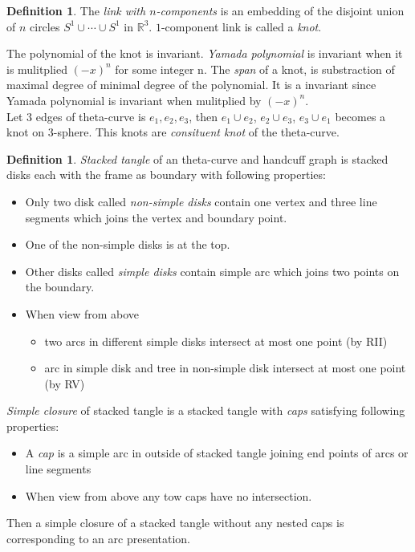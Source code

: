 \documentclass{article}
\theoremstyle{definition}
\newtheorem{defn}[thm]{Definition}
\theoremstyle{theorem}
\theoremstyle{proposition}
\theoremstyle{corollary}
\begin{document}
\begin{defn}
    The \textit{link with $n$-components} is an embedding of the disjoint union of $n$ circles $S^1 \cup \cdots \cup S^1$ in $\mathbb{R}^3$. $1$-component link is called a \textit{knot}.
\end{defn}

The polynomial of the knot is invariant. \textit{Yamada polynomial} is invariant when it is mulitplied $(-x)^n$ for some integer n. The \textit{span} of a knot, is substraction of maximal degree of minimal degree of the polynomial. It is a invariant since Yamada polynomial is invariant when mulitplied by $(-x)^n$.\\

Let 3 edges of theta-curve is $e_1, e_2, e_3$, then $e_1 \cup e_2$, $e_2 \cup e_3$, $e_3 \cup e_1$ becomes a knot on 3-sphere. This knots are \textit{consituent knot} of the theta-curve.

\begin{defn}
    \textit{Stacked tangle} of an theta-curve and handcuff graph is stacked disks each with the frame as boundary with following properties:
\end{defn}
\begin{itemize}
\item Only two disk called \textit{non-simple disks} contain one vertex and three line
segments which joins the vertex and boundary point.
\item One of the non-simple disks is at the top.
\item Other disks called \textit{simple disks} contain simple arc which joins two
points on the boundary.
\item When view from above
\begin{itemize}
    \item two arcs in different simple disks intersect at most one point (by RII)
    \item arc in simple disk and tree in non-simple disk intersect at most one
point (by RV)
\end{itemize}
\end{itemize}

\textit{Simple closure} of stacked tangle is a stacked tangle with \textit{caps} satisfying following properties:
\begin{itemize}
    \item A \textit{cap} is a simple arc in outside of stacked tangle joining end points of arcs or line segments
    \item When view from above any tow caps have no intersection.
\end{itemize}
Then a simple closure of a stacked tangle without any nested caps is
corresponding to an arc presentation.\\
\end{document}
